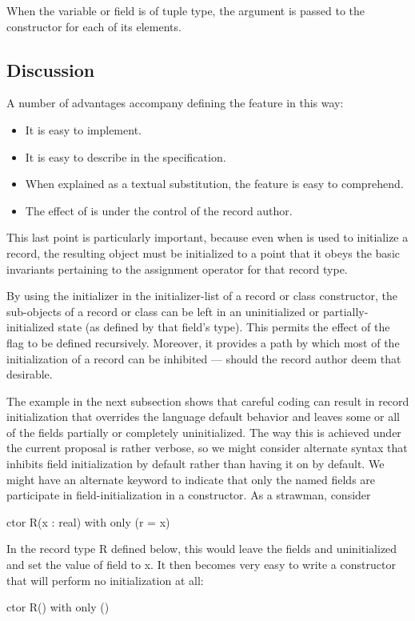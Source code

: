 When the variable or field is of tuple type, the
 argument is passed to the constructor for each of its elements.


\subsection{Discussion}
\label{noinit_Discussion}

A number of advantages accompany defining the  feature in this way:
\begin{itemize}
\item It is easy to implement.
\item It is easy to describe in the specification.
\item When explained as a textual substitution, the feature is easy to comprehend.
\item The effect of  is under the control of the record author.
\end{itemize}

This last point is particularly important, because even when  is used to
initialize a record, the resulting object must be initialized to a point that it obeys the
basic invariants pertaining to the assignment operator for that record type.

By using the  initializer in the initializer-list of a record or class
constructor, the sub-objects of a record or class can be left in an uninitialized or
partially-initialized state (as defined by that field's type).  This permits the effect of
the  flag to be defined recursively.  Moreover, it provides a path by which
most of the initialization of a record can be inhibited --- should the record author deem
that desirable.  

The example in the next subsection shows that careful coding can result in record
initialization that overrides the language default behavior and leaves some or all of the
fields partially or completely uninitialized.  The way this is achieved under the current
proposal is rather verbose, so we might consider alternate syntax that inhibits field
initialization by default rather than having it on by default.  We
might have an alternate keyword to indicate that only the named fields are participate in
field-initialization in a constructor.  As a strawman, consider 
\begin{chapel}
ctor R(x : real)
with only (r = x)
{}
\end{chapel}
In the record type R defined below, this would leave the fields  and 
uninitialized and set the value of field  to x.  It then becomes very easy to write
a constructor that will perform no initialization at all:
\begin{chapel}
ctor R() with only () {}
\end{chapel}

